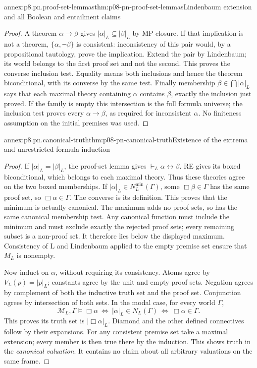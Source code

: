 \begin{annexitem}{annex:p8.pn.proof-set-lemmas}{thm:p08-pn-proof-set-lemmas}{Lindenbaum extension and all Boolean and entailment claims}
\begin{proof}
A theorem \(\alpha\to\beta\) gives
\(|\alpha|_L\subseteq|\beta|_L\) by MP closure. If that
implication is not a theorem, \(\{\alpha,\neg\beta\}\)
is consistent: inconsistency of this pair would, by a propositional
tautology, prove the implication. Extend the pair by Lindenbaum;
its world belongs to the first proof set and not the second.
This proves the converse inclusion test. Equality means both
inclusions and hence the theorem biconditional, with its converse
by the same test. Finally membership
\(\beta\in\bigcap|\alpha|_L\) says that each maximal
theory containing \(\alpha\) contains \(\beta\), exactly
the inclusion just proved. If the family is empty this intersection
is the full formula universe; the inclusion test proves every
\(\alpha\to\beta\), as required for inconsistent \(\alpha\).
No finiteness assumption on the initial premises was used.
\end{proof}
\end{annexitem}

\begin{annexitem}{annex:p8.pn.canonical-truth}{thm:p08-pn-canonical-truth}{Existence of the extrema and unrestricted formula induction}
\begin{proof}
If \(|\alpha|_L=|\beta|_L\), the proof-set lemma gives
\(\vdash_L\alpha\leftrightarrow\beta\). RE gives its boxed
biconditional, which belongs to each maximal theory. Thus these
theories agree on the two boxed memberships. If
\(|\alpha|_L\in N_L^{\min}(\Gamma)\), some
\(\Box\beta\in\Gamma\) has the same proof set, so
\(\Box\alpha\in\Gamma\). The converse is its definition.
This proves that the minimum is actually canonical. The maximum
adds no proof sets, so has the same canonical membership test.
Any canonical function must include the minimum and must exclude
exactly the rejected proof sets; every remaining subset is a
non-proof set. It therefore lies below the displayed maximum.
Consistency of L and Lindenbaum applied to the empty premise set
ensure that \(M_L\) is nonempty.

Now induct on \(\alpha\), without requiring its consistency.
Atoms agree by \(V_L(p)=|p|_L\); constants agree by the
unit and empty proof sets. Negation agrees by complement of both
the inductive truth set and the proof set. Conjunction agrees by
intersection of both sets. In the modal case, for every world
\(\Gamma\),
\[
 \mathcal M_L,\Gamma\models\Box\alpha
 \ \Longleftrightarrow\ |\alpha|_L\in N_L(\Gamma)
 \ \Longleftrightarrow\ \Box\alpha\in\Gamma.
\]
This proves its truth set is \(|\Box\alpha|_L\).
Diamond and the other defined connectives follow by their expansions.
For any consistent premise set take a maximal extension; every
member is then true there by the induction. This shows truth in
the \emph{canonical valuation}. It contains no claim about all
arbitrary valuations on the same frame.
\end{proof}
\end{annexitem}

